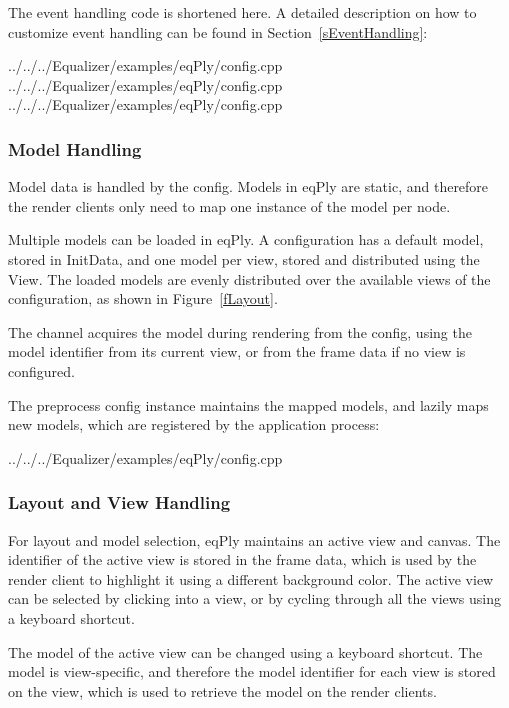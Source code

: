 \documentclass[10pt,a4]{scrartcl}
\newcommand{\fig}[1]{Figure~\ref{#1}}
\newcommand{\sref}[1]{Section~\ref{#1}}
\begin{document}
The event handling code is shortened here. A detailed description on how to
customize event handling can be found in \sref{sEventHandling}:

{\footnotesize
  {../../../Equalizer/examples/eqPly/config.cpp}}
{\footnotesize
  {../../../Equalizer/examples/eqPly/config.cpp}}
{\footnotesize
  {../../../Equalizer/examples/eqPly/config.cpp}}


\subsubsection{Model Handling}

Model data is handled by the config. Models in eqPly are static,
and therefore the render clients only need to map one instance of the
model per node.

Multiple models can be loaded in \textsf{eqPly}. A configuration has a default
model, stored in \textsf{InitData}, and one model per view, stored and
distributed using the \textsf{View}. The loaded models are evenly distributed
over the available views of the configuration, as shown in \fig{fLayout}.

The channel acquires the model during rendering from the config, using
the model identifier from its current view, or from the frame data if
no view is configured.

The preprocess config instance maintains the mapped models, and lazily maps new
models, which are registered by the application process:

{\footnotesize
  {../../../Equalizer/examples/eqPly/config.cpp}}

\subsubsection{Layout and View Handling}

For layout and model selection, \textsf{eqPly} maintains an active view
and canvas. The identifier of the active view is stored in the frame
data, which is used by the render client to highlight it using a
different background color. The active view can be selected by clicking
into a view, or by cycling through all the views using a keyboard
shortcut.

The model of the active view can be changed using a keyboard
shortcut. The model is view-specific, and therefore the model identifier
for each view is stored on the view, which is used to retrieve the model
on the render clients. 
\end{document}
